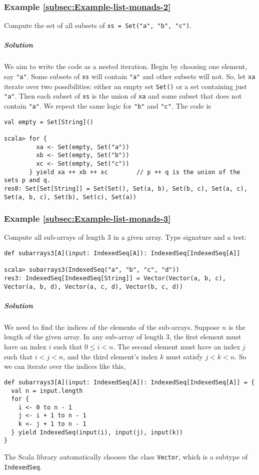 \subsubsection{Example \label{subsec:Example-list-monads-2}\ref{subsec:Example-list-monads-2}}

Compute the set of all subsets of \lstinline!xs = Set("a", "b", "c")!. 

\subparagraph{Solution}

We aim to write the code as a nested iteration. Begin by choosing
one element, say \lstinline!"a"!. Some subsets of \lstinline!xs!
will contain \lstinline!"a"! and other subsets will not. So, let
\lstinline!xa! iterate over two possibilities: either an empty set
\lstinline!Set()! or a set containing just \lstinline!"a"!. Then
each subset of \lstinline!xs! is the union of \lstinline!xa! and
some subset that does not contain \lstinline!"a"!. We repeat the
same logic for \lstinline!"b"! and \lstinline!"c"!. The code is
\begin{lstlisting}
val empty = Set[String]()

scala> for {
         xa <- Set(empty, Set("a"))
         xb <- Set(empty, Set("b"))
         xc <- Set(empty, Set("c"))
       } yield xa ++ xb ++ xc        // p ++ q is the union of the sets p and q.
res0: Set[Set[String]] = Set(Set(), Set(a, b), Set(b, c), Set(a, c), Set(a, b, c), Set(b), Set(c), Set(a))
\end{lstlisting}


\subsubsection{Example \label{subsec:Example-list-monads-3}\ref{subsec:Example-list-monads-3}}

Compute all sub-arrays of length $3$ in a given array. Type signature
and a test:
\begin{lstlisting}
def subarrays3[A](input: IndexedSeq[A]): IndexedSeq[IndexedSeq[A]]

scala> subarrays3(IndexedSeq("a", "b", "c", "d"))
res3: IndexedSeq[IndexedSeq[String]] = Vector(Vector(a, b, c), Vector(a, b, d), Vector(a, c, d), Vector(b, c, d))
\end{lstlisting}


\subparagraph{Solution}

We need to find the indices of the elements of the sub-arrays. Suppose
$n$ is the length of the given array. In any sub-array of length
$3$, the first element must have an index $i$ such that $0\leq i<n$.
The second element must have an index $j$ such that $i<j<n$, and
the third element's index $k$ must satisfy $j<k<n$. So we can iterate
over the indices like this,
\begin{lstlisting}
def subarrays3[A](input: IndexedSeq[A]): IndexedSeq[IndexedSeq[A]] = {
  val n = input.length
  for {
    i <- 0 to n - 1
    j <- i + 1 to n - 1
    k <- j + 1 to n - 1
  } yield IndexedSeq(input(i), input(j), input(k))
}
\end{lstlisting}
The Scala library automatically chooses the class \lstinline!Vector!,
which is a subtype of \lstinline!IndexedSeq!.

